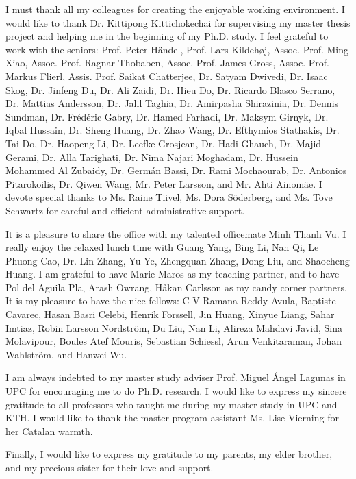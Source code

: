 \documentclass[g5paper,phd,electronic]{kthesis}
\numberwithin{theorem}{chapter}
\numberwithin{lemma}{chapter}
\numberwithin{proposition}{chapter}
\numberwithin{corollary}{chapter}
\numberwithin{remark}{chapter}
\numberwithin{property}{chapter}
\numberwithin{conjecture}{chapter}
\numberwithin{assumption}{chapter}
\numberwithin{algorithm}{chapter}
\begin{document}
I must thank all my colleagues for creating the enjoyable working environment. I would like to thank Dr. Kittipong Kittichokechai for supervising my master thesis project and helping me in the beginning of my Ph.D. study. I feel grateful to work with the seniors: Prof. Peter H\"{a}ndel, Prof. Lars Kildeh\o j, Assoc. Prof. Ming Xiao, Assoc. Prof. Ragnar Thobaben, Assoc. Prof. James Gross, Assoc. Prof. Markus Flierl, Assis. Prof. Saikat Chatterjee, Dr. Satyam Dwivedi, Dr. Isaac Skog, Dr. Jinfeng Du, Dr. Ali Zaidi, Dr. Hieu Do, Dr. Ricardo Blasco Serrano, Dr. Mattias Andersson, Dr. Jalil Taghia, Dr. Amirpasha Shirazinia, Dr. Dennis Sundman, Dr. Fr\'{e}d\'{e}ric Gabry, Dr. Hamed Farhadi, Dr. Maksym Girnyk, Dr. Iqbal Hussain, Dr. Sheng Huang, Dr. Zhao Wang, Dr. Efthymios Stathakis, Dr. Tai Do, Dr. Haopeng Li, Dr. Leefke Grosjean, Dr. Hadi Ghauch, Dr. Majid Gerami, Dr. Alla Tarighati, Dr. Nima Najari Moghadam, Dr. Hussein Mohammed Al Zubaidy, Dr. Germ\'{a}n Bassi, Dr. Rami Mochaourab, Dr. Antonios Pitarokoilis, Dr. Qiwen Wang, Mr. Peter Larsson, and Mr. Ahti Ainom\"{a}e. I devote special thanks to Ms. Raine Tiivel, Ms. Dora S\"{o}derberg, and Ms. Tove Schwartz for careful and efficient administrative support.

It is a pleasure to share the office with my talented officemate Minh Thanh Vu. I really enjoy the relaxed lunch time with Guang Yang, Bing Li, Nan Qi, Le Phuong Cao, Dr. Lin Zhang, Yu Ye, Zhengquan Zhang, Dong Liu, and Shaocheng Huang. I am grateful to have Marie Maros as my teaching partner, and to have Pol del Aguila Pla, Arash Owrang, H\r{a}kan Carlsson as my candy corner partners. It is my pleasure to have the nice fellows: C V Ramana Reddy Avula, Baptiste Cavarec, Hasan Basri Celebi, Henrik Forssell, Jin Huang, Xinyue Liang, Sahar Imtiaz, Robin Larsson Nordstr\"{o}m, Du Liu, Nan Li, Alireza Mahdavi Javid, Sina Molavipour, Boules Atef Mouris, Sebastian Schiessl, Arun Venkitaraman, Johan Wahlstr\"{o}m, and Hanwei Wu.

I am always indebted to my master study adviser Prof. Miguel \'{A}ngel Lagunas in UPC for encouraging me to do Ph.D. research. I would like to express my sincere gratitude to all professors who taught me during my master study in UPC and KTH. I would like to thank the master program assistant Ms. Lise Vierning for her Catalan warmth.

Finally, I would like to express my gratitude to my parents, my elder brother, and my precious sister for their love and support.\newline
\end{document}
